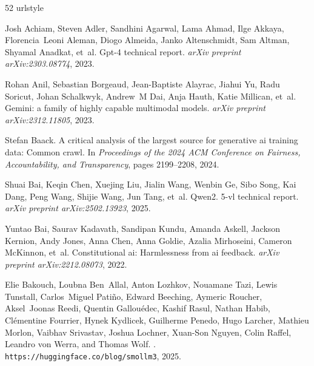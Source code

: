 \begin{thebibliography}{52}
\providecommand{\natexlab}[1]{#1}
\providecommand{\url}[1]{\texttt{#1}}
\expandafter\ifx\csname urlstyle\endcsname\relax
  \providecommand{\doi}[1]{doi: #1}\else
  \providecommand{\doi}{doi: \begingroup \urlstyle{rm}\Url}\fi

Josh Achiam, Steven Adler, Sandhini Agarwal, Lama Ahmad, Ilge Akkaya, Florencia~Leoni Aleman, Diogo Almeida, Janko Altenschmidt, Sam Altman, Shyamal Anadkat, et~al.
\newblock Gpt-4 technical report.
\newblock \emph{arXiv preprint arXiv:2303.08774}, 2023.

Rohan Anil, Sebastian Borgeaud, Jean-Baptiste Alayrac, Jiahui Yu, Radu Soricut, Johan Schalkwyk, Andrew~M Dai, Anja Hauth, Katie Millican, et~al.
\newblock Gemini: a family of highly capable multimodal models.
\newblock \emph{arXiv preprint arXiv:2312.11805}, 2023.

Stefan Baack.
\newblock A critical analysis of the largest source for generative ai training data: Common crawl.
\newblock In \emph{Proceedings of the 2024 ACM Conference on Fairness, Accountability, and Transparency}, pages 2199--2208, 2024.

Shuai Bai, Keqin Chen, Xuejing Liu, Jialin Wang, Wenbin Ge, Sibo Song, Kai Dang, Peng Wang, Shijie Wang, Jun Tang, et~al.
\newblock Qwen2. 5-vl technical report.
\newblock \emph{arXiv preprint arXiv:2502.13923}, 2025.

Yuntao Bai, Saurav Kadavath, Sandipan Kundu, Amanda Askell, Jackson Kernion, Andy Jones, Anna Chen, Anna Goldie, Azalia Mirhoseini, Cameron McKinnon, et~al.
\newblock Constitutional ai: Harmlessness from ai feedback.
\newblock \emph{arXiv preprint arXiv:2212.08073}, 2022.

Elie Bakouch, Loubna Ben~Allal, Anton Lozhkov, Nouamane Tazi, Lewis Tunstall, Carlos~Miguel Patiño, Edward Beeching, Aymeric Roucher, Aksel~Joonas Reedi, Quentin Gallouédec, Kashif Rasul, Nathan Habib, Clémentine Fourrier, Hynek Kydlicek, Guilherme Penedo, Hugo Larcher, Mathieu Morlon, Vaibhav Srivastav, Joshua Lochner, Xuan-Son Nguyen, Colin Raffel, Leandro von Werra, and Thomas Wolf.
.
\newblock \url{https://huggingface.co/blog/smollm3}, 2025.


\end{thebibliography}

